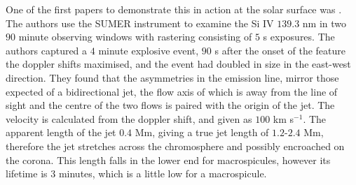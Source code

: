 One of the first papers to demonstrate this in action at the solar surface was \cite{Innes1997}.
The authors use the SUMER instrument to examine the Si IV $139.3$ nm in two $90$ minute observing windows with rastering consisting of $5$ s exposures.
The authors captured a $4$ minute explosive event, $90$ s after the onset of the feature the doppler shifts maximised, and the event had doubled in size in the east-west direction.
They found that the asymmetries in the emission line, mirror those expected of a bidirectional jet, the flow axis of which is away from the line of sight and the centre of the two flows is paired with the origin of the jet.
The velocity is calculated from the doppler shift, and given as $100$ km s$^{-1}$.
The apparent length of the jet $0.4$ Mm, giving a true jet length of $1.2$-$2.4$ Mm, therefore the jet stretches across the chromosphere and possibly encroached on the corona.
This length falls in the lower end for macrospicules, however its lifetime is $3$ minutes, which is a little low for a macrospicule.


